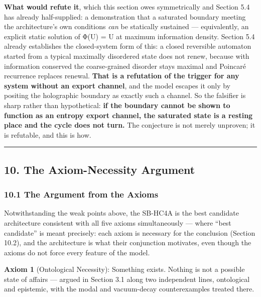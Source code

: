 \documentclass[
]{article}
\begin{document}
\textbf{What would refute it}, which this section owes symmetrically and
Section 5.4 has already half-supplied: a demonstration that a saturated
boundary meeting the architecture's own conditions \emph{can} be
statically sustained --- equivalently, an explicit static solution of
Φ(U) = U at maximum information density. Section 5.4 already establishes
the closed-system form of this: a closed reversible automaton started
from a typical maximally disordered state does not renew, because with
information conserved the coarse-grained disorder stays maximal and
Poincaré recurrence replaces renewal. \textbf{That is a refutation of
the trigger for any system without an export channel}, and the model
escapes it only by positing the holographic boundary as exactly such a
channel. So the falsifier is sharp rather than hypothetical: \textbf{if
the boundary cannot be shown to function as an entropy export channel,
the saturated state is a resting place and the cycle does not turn.} The
conjecture is not merely unproven; it is refutable, and this is how.

\begin{center}\rule{0.5\linewidth}{0.5pt}\end{center}

\hypertarget{the-axiom-necessity-argument}{%
\subsection{10. The Axiom-Necessity
Argument}\label{the-axiom-necessity-argument}}

\hypertarget{the-argument-from-the-axioms}{%
\subsubsection{10.1 The Argument from the
Axioms}\label{the-argument-from-the-axioms}}

Notwithstanding the weak points above, the SB-HC4A is the best candidate
architecture consistent with all five axioms simultaneously --- where
``best candidate'' is meant precisely: each axiom is necessary for the
conclusion (Section 10.2), and the architecture is what their
conjunction motivates, even though the axioms do not force every feature
of the model.

\textbf{Axiom 1} (Ontological Necessity): Something exists. Nothing is
not a possible state of affairs --- argued in Section 3.1 along two
independent lines, ontological and epistemic, with the modal and
vacuum-decay counterexamples treated there.
\end{document}
